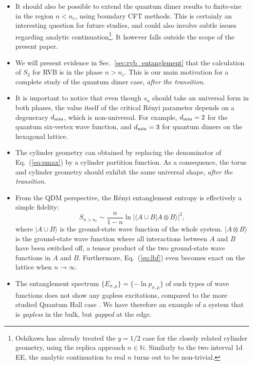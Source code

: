 \documentclass[11pt]{iopart}
\begin{document}
\begin{itemize}
 \item It should also be possible to extend the quantum dimer results\cite{Shannonee,Oshikawa,Zaletel,Stephan2011} to finite-size in the region $n<n_c$, using boundary CFT methods. This is certainly an interesting question for future studies, and could also involve subtle issues regarding analytic continuation\footnote{Oshikawa\cite{Oshikawa} has already treated the $y=1/2$ case for the closely related cylinder geometry, using the replica approach $n\in \mathbb{N}$. Similarly to the two interval 1d EE\cite{CCT1,CCT2}, the analytic continuation to real $n$ turns out to be non-trivial.}. It however falls outside the scope of the present paper.
 \item We will present evidence in Sec.~\ref{sec:rvb_entanglement} that the calculation of $S_2$ for RVB is in the phase $n>n_c$. This is our main motivation for a complete study of the quantum dimer case, \emph{after the transition}.
 \item It is important to notice that even though $s_n$ should take an universal form in both phases, the value itself of the critical R\'enyi parameter depends on a degeneracy $d_{\rm min}$, which is non-universal. For example, $d_{\rm min}=2$ for the quantum six-vertex wave function, and $d_{\rm min}=3$ for quantum dimers on the hexagonal lattice. 
 \item The cylinder geometry can obtained by replacing the denominator of Eq.~(\ref{eq:pmax}) by a cylinder partition function. As a consequence, the torus and cylinder geometry should exhibit the same universal shape, \emph{after the transition}.
 \item From the QDM perspective, the R\'enyi entanglement entropy is effectively a simple fidelity\cite{Bipartite_fidelity}:
 \begin{equation}\label{eq:lbf}
  S_{n>n_c}\sim \frac{n}{1-n} \ln \left|\langle A\cup B|A\otimes B\rangle\right|^2,
 \end{equation}
where $|A\cup B\rangle$ is the ground-state wave function of the whole system. $|A\otimes B\rangle$ is the ground-state wave function where all interactions between $A$ and $B$ have been switched off, a tensor product of the two ground-state wave functions in $A$ and $B$. Furthermore, Eq.~(\ref{eq:lbf}) even becomes exact on the lattice when $n\to \infty$.
  \item The entanglement spectrum $\{E_{\sigma,\mu}\}=\{-\ln p_{\sigma,\mu}\}$ of such types of wave functions does not show any gapless excitations, compared to the more studied Quantum Hall case \cite{HaldaneLi}. We have therefore an example of a system that is \emph{gapless} in the bulk, but \emph{gapped} at the edge. 
\end{itemize}
\end{document}
